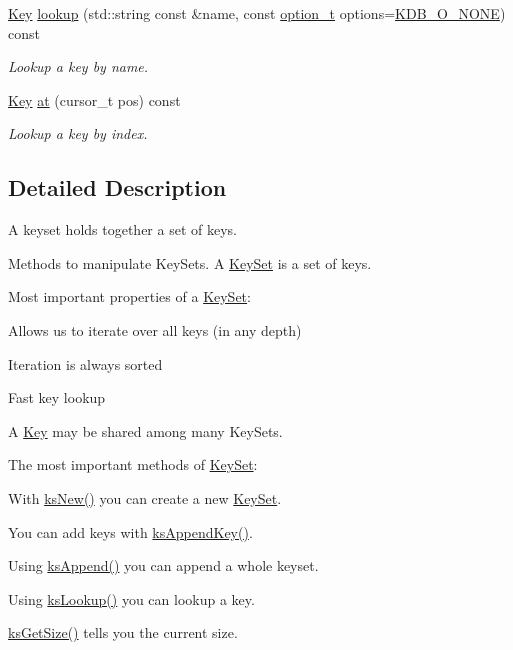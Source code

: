 \begin{DoxyCompactItemize}
\hyperlink{classkdb_1_1Key}{Key} \hyperlink{classkdb_1_1KeySet_a2bb4b6f5c46eb54c4f495832672e1e98}{lookup} (std\+::string const \&name, const \hyperlink{group__keyset_ga98a3d6a4016c9dad9cbd1a99a9c2a45a}{option\+\_\+t} options=\hyperlink{group__keyset_gga98a3d6a4016c9dad9cbd1a99a9c2a45aa00738455e0ae843c8720809d8287f370}{K\+D\+B\+\_\+\+O\+\_\+\+N\+O\+N\+E}) const 
\begin{DoxyCompactList}\small\item\em Lookup a key by name. \end{DoxyCompactList}\item 
\hyperlink{classkdb_1_1Key}{Key} \hyperlink{classkdb_1_1KeySet_ad4aa72767cf702066e804ef054fc7e5b}{at} (cursor\+\_\+t pos) const 
\begin{DoxyCompactList}\small\item\em Lookup a key by index. \end{DoxyCompactList}\end{DoxyCompactItemize}


\subsection{Detailed Description}
A keyset holds together a set of keys. 

Methods to manipulate Key\+Sets. A \hyperlink{classkdb_1_1KeySet}{Key\+Set} is a set of keys.

Most important properties of a \hyperlink{classkdb_1_1KeySet}{Key\+Set}\+:


\begin{DoxyItemize}
\item Allows us to iterate over all keys (in any depth)
\item Iteration is always sorted
\item Fast key lookup
\item A \hyperlink{classkdb_1_1Key}{Key} may be shared among many Key\+Sets.
\end{DoxyItemize}

The most important methods of \hyperlink{classkdb_1_1KeySet}{Key\+Set}\+:


\begin{DoxyItemize}
\item With \hyperlink{group__keyset_ga671e1aaee3ae9dc13b4834a4ddbd2c3c}{ks\+New()} you can create a new \hyperlink{classkdb_1_1KeySet}{Key\+Set}.
\item You can add keys with \hyperlink{group__keyset_gaa5a1d467a4d71041edce68ea7748ce45}{ks\+Append\+Key()}.
\item Using \hyperlink{group__keyset_ga21eb9c3a14a604ee3a8bdc779232e7b7}{ks\+Append()} you can append a whole keyset.
\item Using \hyperlink{group__keyset_gaa34fc43a081e6b01e4120daa6c112004}{ks\+Lookup()} you can lookup a key.
\item \hyperlink{group__keyset_ga7474ad6b0a0fa969dbdf267ba5770eee}{ks\+Get\+Size()} tells you the current size.
\end{DoxyItemize}


